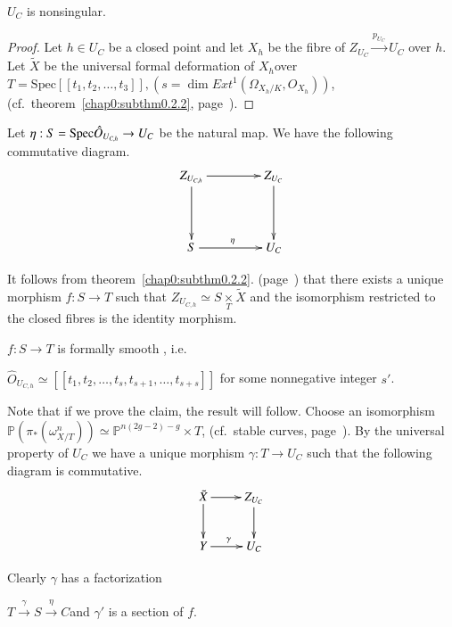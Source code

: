 \setcounter{subtheorem}{0}
\begin{subtheorem}%
$U_C$ is nonsingular.
\end{subtheorem}

\begin{proof}
Let $h \in U_C$ be a closed point and let $X_h$ be the fibre
of $Z_{U_C} \xrightarrow{p_{U_C}} U_C$ over $h$. Let $\tilde{X}$ be
the universal formal deformation of $X_h$over $T= \text{Spec} [[t_1,
t_2, \ldots, t_3]], (s = \dim Ext^1 (\Omega_{X_{h}/ K} , 
O_{X_h}))$, (cf.\ theorem~\ref{chap0:subthm0.2.2},\break 
page~\pageref{chap0:subthm0.2.2}).  
\end{proof}

Let $\eta : S = {\rm Spec} \hat{O}_{U_{C,h}} \to U_C$ be the natural
map. We have the following commutative diagram. 
\[
\xymatrix@R=1.5cm@C=1.5cm{
Z_{U_{C,h}} \ar[r]\ar[d] & Z_{U_C} \ar[d]\\
S \ar[r]^\eta & U_C
}
\]\pageoriginale 

\noindent
It follows from theorem~\ref{chap0:subthm0.2.2}. 
(page~\pageref{chap0:subthm0.2.2}) that there exists a 
unique morphism $f : S\to T$ such that $Z_{U_{C,h}} \simeq S
\underset{T}\times \tilde{X}$ and the isomorphism restricted to the
closed fibres is the identity morphism. 

\medskip
{}
 $f : S \to T$ is formally smooth , i.e.  

$\hat{O}_{U_{C,h}}\simeq [[t_1,t_2, \ldots , t_s, t_{s+1}, \ldots ,
    t_{s+s}]]$ for some nonnegative integer $s'$. 

Note that if we prove the claim, the result will follow. Choose an
isomorphism $\mathbb{P} (\pi_* (\omega_{X/T}^n)) \simeq \mathbb{P}^{n
  (2g -2)-g} \times T$, (cf.\ stable curves, page~\pageref{page12}). By the
universal property of $U_C$ we have a unique morphism $\gamma : T \to
U_C$ such that the following diagram is commutative. 
\[
\xymatrix{
\tilde{X} \ar[r]\ar[d] & Z_{U_C} \ar[d]\\
Y \ar[r]^{\gamma} & U_C
}
\]

\noindent
Clearly $\gamma$ has a factorization 

\noindent
$T \xrightarrow{\gamma} S \xrightarrow{\eta} C$\pageoriginale  and
$\gamma'$ is a section of $f$. 

